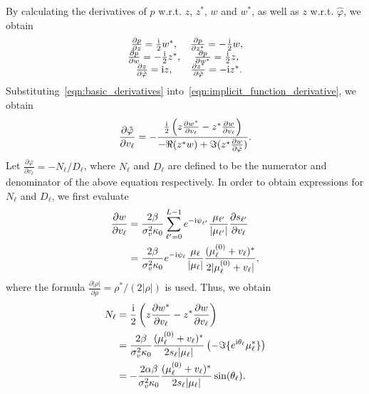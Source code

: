 \documentclass[a4paper,12pt]{article}
\def \ri {{\rm i}}
\begin{document}
By calculating the derivatives of $p$ w.r.t. $z$, $z^*$, $w$ and $w^*$, as well as $z$ w.r.t. $\hat{\varphi}$, we obtain 
\begin{equation}
    \begin{array}{cc}
    \frac{\partial p}{\partial z}=\frac{\ri}{2} w^*, & \frac{\partial p}{\partial z^*}=-\frac{\ri}{2} w, \\
    \frac{\partial p}{\partial w}=-\frac{\ri}{2} z^*, & \frac{\partial p}{\partial w^*}=\frac{\ri}{2} z, \\
    \frac{\partial z}{\partial \hat\varphi}=\ri z, & \frac{\partial z^*}{\partial \hat\varphi}=-\ri z^*. 
    \end{array}
    \label{eqn:basic_derivatives}
\end{equation}
Substituting~\eqref{eqn:basic_derivatives} into~\eqref{eqn:implicit_function_derivative}, we obtain 
\begin{equation}
    \frac{\partial \hat\varphi}{\partial v_\ell} = -\frac{\frac{\ri}{2} \left( z\frac{\partial w^*}{\partial v_\ell} -z^* \frac{\partial w}{\partial v_\ell} \right)}{-\Re(z^*w) +\Im(z^* \frac{\partial w}{\partial \hat{\varphi}})}. 
\end{equation}
Let $\frac{\partial \varphi}{\partial v_\ell} = -N_\ell / D_\ell$, where $N_\ell$ and $D_\ell$ are defined to be the numerator and denominator of the above equation respectively. In order to obtain expressions for $N_\ell$ and $D_\ell$, we first evaluate 
\begin{equation}
    \begin{aligned}
        \frac{\partial w}{\partial v_\ell}&=\frac{2\beta}{\sigma_v^2 \kappa_0} \sum_{\ell'=0}^{L-1} e^{-\ri \psi_{\ell'}} \frac{\mu_{\ell'}}{|\mu_{\ell'}|} \frac{\partial s_{\ell'}}{\partial v_\ell} \\
        &= \frac{2\beta}{\sigma_v^2 \kappa_0} e^{-\ri \psi_\ell}\frac{\mu_\ell}{|\mu_\ell|} \frac{(\mu_\ell^{(0)} + v_\ell)^*}{2|\mu_\ell^{(0)} + v_\ell|}, 
    \end{aligned}
\end{equation}
where the formula $\frac{\partial |\rho|}{\partial \rho}  = \rho^*/(2|\rho|)$ is used. 
Thus, we obtain 
\begin{equation}
    \begin{aligned}
        N_\ell &= \frac{\ri}{2} \left( z\frac{\partial w^*}{\partial v_\ell} -z^* \frac{\partial w}{\partial v_\ell} \right) \\
        &= \frac{2\beta}{\sigma_v^2 \kappa_0} \frac{(\mu_\ell^{(0)} + v_\ell)^*}{2s_\ell |\mu_\ell|} \left(-\Im\{e^{\ri \theta_\ell} \mu_\ell^* \}\right) \\
        &= -\frac{2\alpha\beta}{\sigma_v^2 \kappa_0} \frac{(\mu_\ell^{(0)} + v_\ell)^*}{2s_\ell |\mu_\ell|} \sin(\theta_\ell). 
    \end{aligned}
\end{equation}
\end{document}
